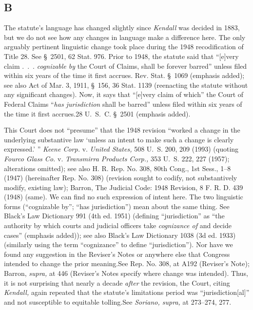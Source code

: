 \subsection{B}

  The statute's language has changed slightly since \emph{Kendall} was decided in 1883, but we do not see how any changes in language make a difference here. The only arguably pertinent linguistic change took place during the 1948 recodification of Title 28. See \S~2501, 62 Stat. 976. Prior to 1948, the statute said that ``[e]very claim .~.~. \emph{cognizable by} the Court of Claims, shall be forever barred'' unless filed within six years of the time it first accrues. Rev. Stat. \S~1069 (emphasis added); see also Act of Mar. 3, 1911, \S~156, 36 Stat. 1139 (reenacting the statute without any significant changes). Now, it says that ``[e]very claim of which'' the Court of Federal Claims ``\emph{has jurisdiction} shall be barred'' unless filed within six years of the time it first accrues.28 U.~S.~C. \S~2501 (emphasis added).\newpage 

  This Court does not ``presume'' that the 1948 revision ``worked a change in the underlying substantive law ‘unless an intent to make such a change is clearly expressed.' '' \emph{Keene Corp.} v. \emph{United States,} 508 U.~S. 200, 209 (1993) (quoting \emph{Fourco Glass Co.} v. \emph{Transmirra Products Corp.,} 353 U.~S. 222, 227 (1957); alterations omitted); see also H. R. Rep. No. 308, 80th Cong., 1st Sess., 1--8 (1947) (hereinafter Rep. No. 308) (revision sought to codify, not substantively modify, existing law); Barron, The Judicial Code: 1948 Revision, 8 F. R. D. 439 (1948) (same). We can find no such expression of intent here. The two linguistic forms (``cognizable by''; ``has jurisdiction'') mean about the same thing. See Black's Law Dictionary 991 (4th ed. 1951) (defining ``jurisdiction'' as ``the authority by which courts and judicial officers take \emph{cognizance of} and decide cases'' (emphasis added)); see also Black's Law Dictionary 1038 (3d ed. 1933) (similarly using the term ``cognizance'' to define ``jurisdiction''). Nor have we found any suggestion in the Reviser's Notes or anywhere else that Congress intended to change the prior meaning.See Rep. No. 308, at A192 (Reviser's Note); Barron, \emph{supra,} at 446 (Reviser's Notes specify where change was intended). Thus, it is not surprising that nearly a decade \emph{after} the revision, the Court, citing \emph{Kendall,} again repeated that the statute's limitations period was ``jurisdiction[al]'' and not susceptible to equitable tolling.See \emph{Soriano, supra,} at 273--274, 277.

